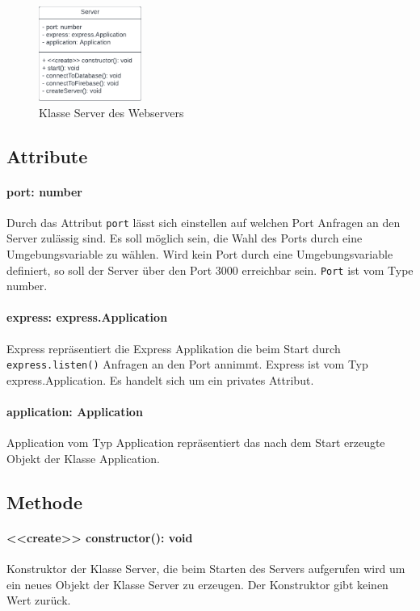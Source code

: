 \documentclass{entwurfsheft}
\begin{document}
\begin{figure}[htp]
    \centering
    \includegraphics[width = 0.3\textwidth]{images/webserver/server.pdf}
    \caption{Klasse Server des Webservers}
    \label{fig:server}
\end{figure}

\subsection*{Attribute}
\paragraph{port: number}
Durch das Attribut \texttt{port} lässt sich einstellen auf welchen Port Anfragen an den Server zulässig sind. Es soll möglich sein, die Wahl des Ports durch eine Umgebungsvariable zu wählen. Wird kein Port durch eine Umgebungsvariable definiert, so soll der Server über den Port 3000 erreichbar sein.
\texttt{Port} ist vom Type number.
\paragraph{express: express.Application}
Express repräsentiert die Express Applikation die beim Start durch \texttt{express.listen()} Anfragen an den Port annimmt.
Express ist vom Typ express.Application. Es handelt sich um ein privates Attribut.
\paragraph{application: Application}
Application vom Typ Application repräsentiert das nach dem Start erzeugte Objekt der Klasse Application.

\subsection*{Methode}
\paragraph{<<create>> constructor(): void}
Konstruktor der Klasse Server, die beim Starten des Servers aufgerufen wird um ein neues Objekt der Klasse Server zu erzeugen. Der Konstruktor gibt keinen Wert zurück.
\end{document}
